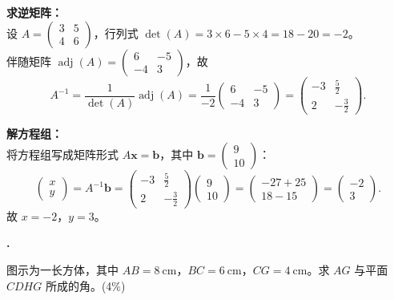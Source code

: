 \documentclass[12pt,a4paper]{ctexart}
\newcounter{qnum}
\newenvironment{question}
  {%
    \stepcounter{qnum}%
    \vspace{0.8em}%
    \noindent\textbf{\theqnum.}\enspace
  }
  {\par\vspace{0.4em}}
\newenvironment{solution}
  {%
    \par\noindent
  }
  {\par}
\begin{document}
\begin{solution}
    \textbf{求逆矩阵：} \\
    设 $A = \begin{pmatrix}3&5\\4&6\end{pmatrix}$，行列式 $\det(A) = 3\times6 - 5\times4 = 18-20 = -2$。\\
    伴随矩阵 $\operatorname{adj}(A) = \begin{pmatrix}6&-5\\-4&3\end{pmatrix}$，故
    \[
        A^{-1} = \frac{1}{\det(A)}\operatorname{adj}(A)
        = \frac{1}{-2}\begin{pmatrix}6&-5\\-4&3\end{pmatrix}
        = \begin{pmatrix}-3 & \frac{5}{2}\\[4pt]2 & -\frac{3}{2}\end{pmatrix}.
    \]

    \textbf{解方程组：} \\
    将方程组写成矩阵形式 $A\mathbf{x} = \mathbf{b}$，其中 $\mathbf{b} = \begin{pmatrix}9\\10\end{pmatrix}$：
    \[
        \begin{pmatrix}x\\y\end{pmatrix} = A^{-1}\mathbf{b}
        = \begin{pmatrix}-3 & \frac{5}{2}\\[4pt]2 & -\frac{3}{2}\end{pmatrix}
          \begin{pmatrix}9\\10\end{pmatrix}
        = \begin{pmatrix}-27+25\\[4pt]18-15\end{pmatrix}
        = \begin{pmatrix}-2\\3\end{pmatrix}.
    \]
    故 $x = -2$，$y = 3$。
\end{solution}

\begin{question}
    图示为一长方体，其中 $AB = 8\ \text{cm}$，$BC = 6\ \text{cm}$，$CG = 4\ \text{cm}$。求 $AG$ 与平面 $CDHG$ 所成的角。\hfill(4\%)
\end{question}
\end{document}
